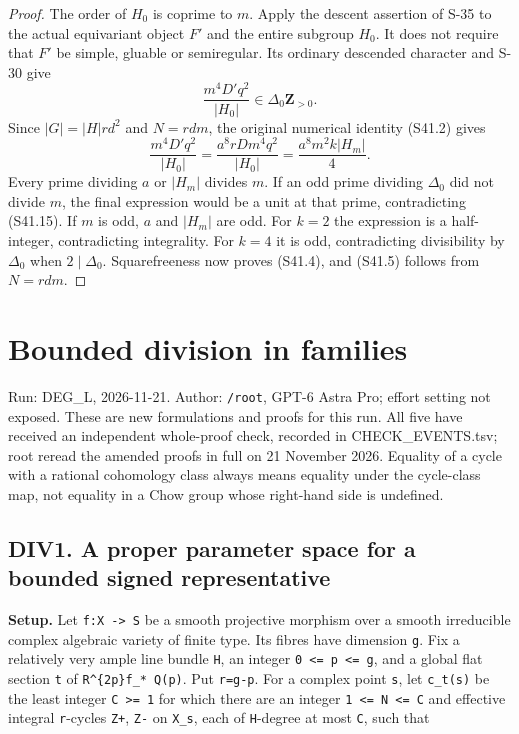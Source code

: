 \documentclass[11pt,a4paper]{article}
\theoremstyle{definition}
\begin{document}
\begin{proof}
The order of \(H_0\) is coprime to \(m\). Apply the descent assertion of S-35 to the actual equivariant object \(F'\) and the entire subgroup \(H_0\). It does not require that \(F'\) be simple, gluable or semiregular. Its ordinary descended character and S-30 give \[
 \frac{m^4D'q^2}{|H_0|}\in\Delta_0\mathbf Z_{>0}.
 \tag{S41.15}
\] Since \(|G|=|H|rd^2\) and \(N=rdm\), the original numerical identity (S41.2) gives \[
 \frac{m^4D'q^2}{|H_0|}
  =\frac{a^8rD m^4q^2}{|H_0|}
  =\frac{a^8m^2 k |H_m|}{4}.
 \tag{S41.16}
\] Every prime dividing \(a\) or \(|H_m|\) divides \(m\). If an odd prime dividing \(\Delta_0\) did not divide \(m\), the final expression would be a unit at that prime, contradicting (S41.15). If \(m\) is odd, \(a\) and \(|H_m|\) are odd. For \(k=2\) the expression is a half-integer, contradicting integrality. For \(k=4\) it is odd, contradicting divisibility by \(\Delta_0\) when \(2\mid\Delta_0\). Squarefreeness now proves (S41.4), and (S41.5) follows from \(N=rdm\).
\end{proof}


\section{Bounded division in families}

Run: DEG\_L, 2026-11-21. Author: \texttt{/root}, GPT-6 Astra Pro; effort
setting not exposed. These are new formulations and proofs for this run.
All five have received an independent whole-proof check, recorded in
CHECK\_EVENTS.tsv; root reread the amended proofs in full on 21 November
2026. Equality of a cycle with a rational cohomology class always means
equality under the cycle-class map, not equality in a Chow group whose
right-hand side is undefined.

\subsection{DIV1. A proper parameter space for a bounded signed
representative}\label{bounded-division-div1.-a-proper-parameter-space-for-a-bounded-signed-representative}

\textbf{Setup.} Let \texttt{f:X\ -\textgreater{}\ S} be a smooth
projective morphism over a smooth irreducible complex algebraic variety
of finite type. Its fibres have dimension \texttt{g}. Fix a relatively
very ample line bundle \texttt{H}, an integer
\texttt{0\ \textless{}=\ p\ \textless{}=\ g}, and a global flat section
\texttt{t} of \texttt{R\^{}\{2p\}f\_*\ Q(p)}. Put \texttt{r=g-p}. For a
complex point \texttt{s}, let \texttt{c\_t(s)} be the least integer
\texttt{C\ \textgreater{}=\ 1} for which there are an integer
\texttt{1\ \textless{}=\ N\ \textless{}=\ C} and effective integral
\texttt{r}-cycles \texttt{Z+}, \texttt{Z-} on \texttt{X\_s}, each of
\texttt{H}-degree at most \texttt{C}, such that
\end{document}
